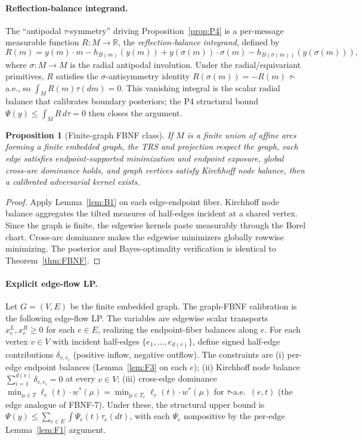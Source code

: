 \documentclass[11pt]{article}
\newtheorem{proposition}[theorem]{Proposition}
\theoremstyle{definition}
\theoremstyle{remark}
\newcommand{\R}{\mathbb{R}}
\begin{document}
\paragraph{Reflection-balance integrand.} The ``antipodal $\tau$-symmetry'' driving Proposition~\ref{prop:P4} is a per-message measurable function $R:M\to\R$, the \emph{reflection-balance integrand}, defined by
\[
  R(m)
  = y(m)\cdot m - h_{B(m)}(y(m))
   + y(\sigma(m))\cdot\sigma(m) - h_{B(\sigma(m))}(y(\sigma(m))),
\]
where $\sigma:M\to M$ is the radial antipodal involution. Under the radial/equivariant primitives, $R$ satisfies the $\sigma$-antisymmetry identity $R(\sigma(m))=-R(m)$ $\tau$-a.e., so $\int_M R(m)\tau(dm)=0$. This vanishing integral is the scalar radial balance that calibrates boundary posteriors; the P4 structural bound $\Psi(y)\le\int_M R\,d\tau=0$ then closes the argument.

\begin{proposition}[Finite-graph FBNF class]\label{prop:graphfbnf}
If $M$ is a finite union of affine arcs forming a finite embedded graph, the TRS and projection respect the graph, each edge satisfies endpoint-supported minimization and endpoint exposure, global cross-arc dominance holds, and graph vertices satisfy Kirchhoff node balance, then a calibrated adversarial kernel exists.
\end{proposition}

\begin{proof}
Apply Lemma~\ref{lem:B1} on each edge-endpoint fiber. Kirchhoff node balance aggregates the tilted measures of half-edges incident at a shared vertex. Since the graph is finite, the edgewise kernels paste measurably through the Borel chart. Cross-arc dominance makes the edgewise minimizers globally rowwise minimizing. The posterior and Bayes-optimality verification is identical to Theorem~\ref{thm:FBNF}.
\end{proof}

\paragraph{Explicit edge-flow LP.} Let $G=(V,E)$ be the finite embedded graph. The graph-FBNF calibration is the following edge-flow LP. The variables are edgewise scalar transports $x_e^L, x_e^R\ge 0$ for each $e\in E$, realizing the endpoint-fiber balances along $e$. For each vertex $v\in V$ with incident half-edges $\{e_1,\ldots,e_{d(v)}\}$, define signed half-edge contributions $\delta_{v,e_i}$ (positive inflow, negative outflow). The constraints are (i) per-edge endpoint balances (Lemma~\ref{lem:F3} on each $e$); (ii) Kirchhoff node balance $\sum_{i=1}^{d(v)}\delta_{v,e_i}=0$ at every $v\in V$; (iii) cross-edge dominance $\min_{\mu\in T}\ell_e(t)\cdot w^*(\mu)=\min_{\mu\in T_e}\ell_e(t)\cdot w^*(\mu)$ for $\bar\tau$-a.e.\ $(e,t)$ (the edge analogue of FBNF-7). Under these, the structural upper bound is $\Psi(y)\le\sum_{e\in E}\int\Psi_e(t)\tau_e(dt)$, with each $\Psi_e$ nonpositive by the per-edge Lemma~\ref{lem:F1} argument.
\end{document}
